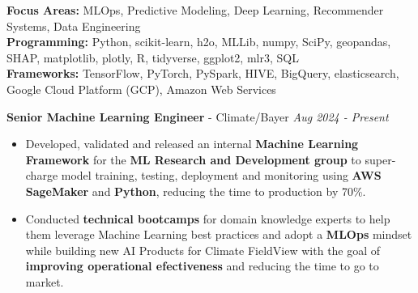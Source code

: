 \documentclass[hidelinks, 10pt, A4]{article} %
\begin{document}
\noindent{\Large \textcolor{sectcol}{Skills}} \hspace{5pt}
\medskip
\noindent{\\} %
\textbf{Focus Areas:} MLOps, Predictive Modeling, Deep Learning, Recommender Systems, Data Engineering
\\
\smallskip
\textbf{Programming:} Python, scikit-learn, h2o, MLLib, numpy, SciPy, geopandas, SHAP, matplotlib, plotly, R, tidyverse, ggplot2, mlr3, SQL
\\
\smallskip
\textbf{Frameworks:} TensorFlow, PyTorch, PySpark, HIVE, BigQuery, elasticsearch, Google Cloud Platform (GCP), Amazon Web Services
\\
{\color{mygray} \hrulefill }
\medskip

\noindent{\Large \textcolor{sectcol}{Professional Experience}} \medskip

\noindent \centerline{\large \textbf{Senior Machine Learning Engineer} \textcolor{bgcol}{ - Climate/Bayer}
\hfill \it Aug 2024 - Present}
\begin{itemize}
  \item Developed, validated and released an internal \textbf{Machine Learning Framework} for the \textbf{ML Research and Development group} to super-charge model training, testing, deployment and monitoring using \textbf{AWS SageMaker} and \textbf{Python}, reducing the time to production by 70\%.
  \item Conducted \textbf{technical bootcamps} for domain knowledge experts to help them leverage Machine Learning best practices and adopt a \textbf{MLOps} mindset while building new AI Products for Climate FieldView with the goal of \textbf{improving operational efectiveness} and reducing the time to go to market.
\end{itemize}
\end{document}
